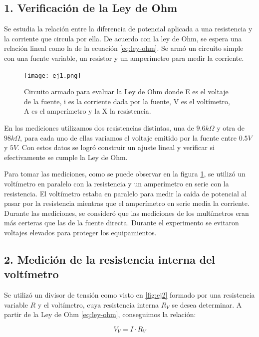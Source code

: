 \documentclass[11pt]{article}
\begin{document}
\subsection*{1. Verificación de la Ley de Ohm}

Se estudia la relación entre la diferencia de potencial aplicada a una resistencia y la corriente que circula por ella. De acuerdo con la ley de Ohm, se espera una relación lineal como la de la ecuación \ref{eq:ley-ohm}. Se armó un circuito simple con una fuente variable, un resistor y un amperímetro para medir la corriente.

\begin{figure}[H]
    \centering
    \texttt{[image: ej1.png]}
    \caption{Circuito armado para evaluar la Ley de Ohm donde E es el voltaje de la fuente, i es la corriente dada por la fuente, V es el voltímetro, A es el amperímetro y la X la resistencia.}
    \label{fig:ej1}
\end{figure}

En las mediciones utilizamos dos resistencias distintas, una de $9.6k\Omega$ y otra de $98k\Omega$, para cada uno de ellas variamos el voltaje emitido por la fuente entre $0.5V$ y $5V$. Con estos datos se logró construir un ajuste lineal y verificar si efectivamente se cumple la Ley de Ohm. 

Para tomar las mediciones, como se puede observar en la figura \ref{fig:ej1}, se utilizó un voltímetro en paralelo con la resistencia y un amperímetro en serie con la resistencia. El voltímetro estaba en paralelo para medir la caída de potencial al pasar por la resistencia mientras que el amperímetro en serie media la corriente. Durante las mediciones, se consideró que las mediciones de los multímetros eran más certeras que las de la fuente directa. Durante el experimento se evitaron voltajes elevados para proteger los equipamientos.

\subsection*{2. Medición de la resistencia interna del voltímetro}

Se utilizó un divisor de tensión como visto en \ref{fig:ej2} formado por una resistencia variable \( R \) y el voltímetro, cuya resistencia interna \( R_V \) se desea determinar. A partir de la Ley de Ohm \ref{eq:ley-ohm}, conseguimos la relación:

\begin{equation*}
    V_V = I \cdot R_V
\end{equation*}
\end{document}
